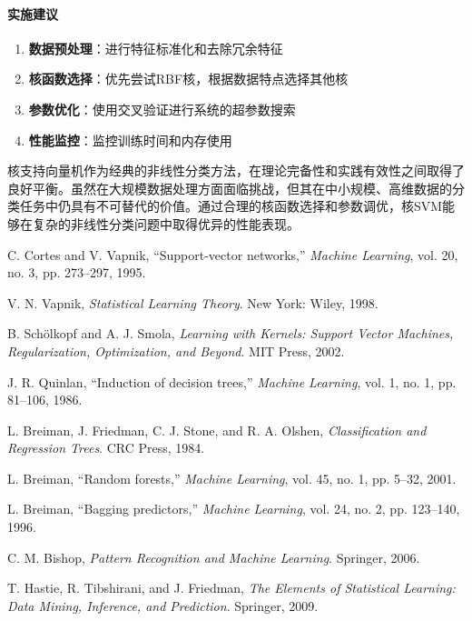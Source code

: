 \documentclass[UTF8]{report}
\theoremstyle{MyLineTheoremStyle} %
\theoremstyle{MyBlockTheoremStyle} %
\theoremstyle{MySubsubsectionStyle} %
\begin{document}
\paragraph{实施建议}
\begin{enumerate}[label=\arabic*.]
    \item \textbf{数据预处理}：进行特征标准化和去除冗余特征
    \item \textbf{核函数选择}：优先尝试RBF核，根据数据特点选择其他核
    \item \textbf{参数优化}：使用交叉验证进行系统的超参数搜索
    \item \textbf{性能监控}：监控训练时间和内存使用
\end{enumerate}


核支持向量机作为经典的非线性分类方法，在理论完备性和实践有效性之间取得了良好平衡。虽然在大规模数据处理方面面临挑战，但其在中小规模、高维数据的分类任务中仍具有不可替代的价值。通过合理的核函数选择和参数调优，核SVM能够在复杂的非线性分类问题中取得优异的性能表现。


\begin{thebibliography}{99}

C. Cortes and V. Vapnik, ``Support-vector networks,'' \textit{Machine Learning}, vol. 20, no. 3, pp. 273--297, 1995.

V. N. Vapnik, \textit{Statistical Learning Theory}. New York: Wiley, 1998.

B. Schölkopf and A. J. Smola, \textit{Learning with Kernels: Support Vector Machines, Regularization, Optimization, and Beyond}. MIT Press, 2002.

J. R. Quinlan, ``Induction of decision trees,'' \textit{Machine Learning}, vol. 1, no. 1, pp. 81--106, 1986.

L. Breiman, J. Friedman, C. J. Stone, and R. A. Olshen, \textit{Classification and Regression Trees}. CRC Press, 1984.

L. Breiman, ``Random forests,'' \textit{Machine Learning}, vol. 45, no. 1, pp. 5--32, 2001.

L. Breiman, ``Bagging predictors,'' \textit{Machine Learning}, vol. 24, no. 2, pp. 123--140, 1996.

C. M. Bishop, \textit{Pattern Recognition and Machine Learning}. Springer, 2006.

T. Hastie, R. Tibshirani, and J. Friedman, \textit{The Elements of Statistical Learning: Data Mining, Inference, and Prediction}. Springer, 2009.

\end{thebibliography}
\end{document}
